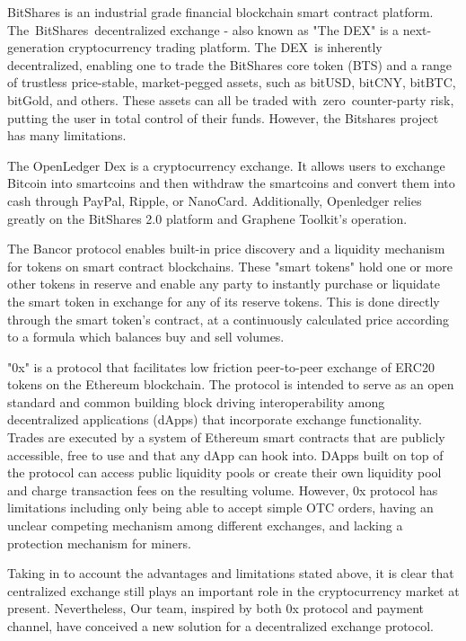 \documentclass[UTF8,nofonts]{article}
\begin{document}
BitShares\cite{schuhbitshares}\cite{schuh2015bitshares} is an industrial grade financial blockchain smart contract platform. The BitShares decentralized exchange - also known as "The DEX" is a next-generation cryptocurrency trading platform. The DEX is inherently decentralized, enabling one to trade the BitShares core token (BTS) and a range of trustless price-stable, market-pegged assets, such as bitUSD, bitCNY, bitBTC, bitGold, and others. These assets can all be traded with zero counter-party risk, putting the user in total control of their funds. However, the Bitshares project has many limitations.

The OpenLedger Dex\cite{openledger} is a cryptocurrency exchange. It allows users to exchange Bitcoin into smartcoins and then withdraw the smartcoins and convert them into cash through PayPal, Ripple, or NanoCard. Additionally, Openledger relies greatly on the BitShares 2.0 platform and Graphene Toolkit's operation.

The Bancor\cite{bancor}\cite{hanson2012logarithmic} protocol enables built-in price discovery and a liquidity mechanism for tokens on smart contract blockchains. These "smart tokens" hold one or more other tokens in reserve and enable any party to instantly purchase or liquidate the smart token in exchange for any of its reserve tokens. This is done directly through the smart token's contract, at a continuously calculated price according to a formula which balances buy and sell volumes.

"0x"\cite{warren20170x} is a protocol that facilitates low friction peer-to-peer exchange of ERC20\cite{ERC20} tokens on the Ethereum blockchain. The protocol is intended to serve as an open standard and common building block driving interoperability among decentralized applications (dApps) that incorporate exchange functionality. Trades are executed by a system of Ethereum smart contracts that are publicly accessible, free to use and that any dApp can hook into. DApps built on top of the protocol can access public liquidity pools or create their own liquidity pool and charge transaction fees on the resulting volume. However, 0x protocol has limitations including  only being able to accept simple OTC orders, having an unclear competing mechanism among different exchanges, and lacking a protection mechanism for miners.

Taking in to account the advantages and limitations stated above, it is clear that centralized exchange still plays an important role in the cryptocurrency market at present. Nevertheless, Our team, inspired by both 0x protocol and payment channel, have conceived a new solution for a decentralized exchange protocol.
\end{document}
